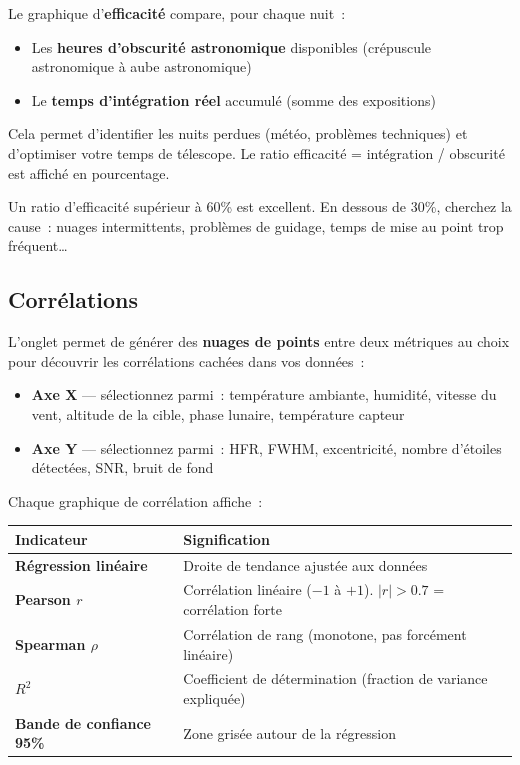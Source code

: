 \documentclass[a4paper,11pt]{article}
\begin{document}
Le graphique d'\textbf{efficacit\'{e}} compare, pour chaque nuit~:

\begin{itemize}
    \item Les \textbf{heures d'obscurit\'{e} astronomique} disponibles (cr\'{e}puscule astronomique \`{a} aube astronomique)
    \item Le \textbf{temps d'int\'{e}gration r\'{e}el} accumul\'{e} (somme des expositions)
\end{itemize}

Cela permet d'identifier les nuits perdues (m\'{e}t\'{e}o, probl\`{e}mes techniques) et d'optimiser votre temps de t\'{e}lescope. Le ratio efficacit\'{e} = int\'{e}gration / obscurit\'{e} est affich\'{e} en pourcentage.

\begin{tipbox}
Un ratio d'efficacit\'{e} sup\'{e}rieur \`{a} 60\% est excellent. En dessous de 30\%, cherchez la cause~: nuages intermittents, probl\`{e}mes de guidage, temps de mise au point trop fr\'{e}quent\ldots
\end{tipbox}

\subsection{Corr\'{e}lations}

L'onglet permet de g\'{e}n\'{e}rer des \textbf{nuages de points} entre deux m\'{e}triques au choix pour d\'{e}couvrir les corr\'{e}lations cach\'{e}es dans vos donn\'{e}es~:

\begin{itemize}
    \item \textbf{Axe X} --- s\'{e}lectionnez parmi~: temp\'{e}rature ambiante, humidit\'{e}, vitesse du vent, altitude de la cible, phase lunaire, temp\'{e}rature capteur
    \item \textbf{Axe Y} --- s\'{e}lectionnez parmi~: HFR, FWHM, excentricit\'{e}, nombre d'\'{e}toiles d\'{e}tect\'{e}es, SNR, bruit de fond
\end{itemize}

Chaque graphique de corr\'{e}lation affiche~:

\begin{center}
\begin{tabularx}{\textwidth}{l X}
\toprule
\textbf{Indicateur} & \textbf{Signification} \\
\midrule
\textbf{R\'{e}gression lin\'{e}aire} & Droite de tendance ajust\'{e}e aux donn\'{e}es \\
\textbf{Pearson $r$} & Corr\'{e}lation lin\'{e}aire ($-1$ \`{a} $+1$). $|r| > 0.7$ = corr\'{e}lation forte \\
\textbf{Spearman $\rho$} & Corr\'{e}lation de rang (monotone, pas forc\'{e}ment lin\'{e}aire) \\
\textbf{$R^2$} & Coefficient de d\'{e}termination (fraction de variance expliqu\'{e}e) \\
\textbf{Bande de confiance 95\%} & Zone gris\'{e}e autour de la r\'{e}gression \\
\bottomrule
\end{tabularx}
\end{center}
\end{document}

